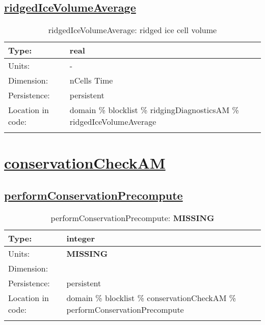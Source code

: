 \subsection[ridgedIceVolumeAverage]{\hyperref[sec:var_tab_ridgingDiagnosticsAM]{ridgedIceVolumeAverage}}
\label{subsec:var_sec_ridgingDiagnosticsAM_ridgedIceVolumeAverage}
\begin{center}
\begin{longtable}{| p{2.0in} | p{4.0in} |}
        \hline 
        Type: & real \\
        \hline 
        Units: & \si{-} \\
        \hline 
        Dimension: & nCells Time \\
        \hline 
        Persistence: & persistent \\
        \hline 
         Location in code: & domain \% blocklist \% ridgingDiagnosticsAM \% ridgedIceVolumeAverage \\
         \hline 
    \caption{ridgedIceVolumeAverage: ridged ice cell volume}
\end{longtable}
\end{center}
\section[conservationCheckAM]{\hyperref[sec:var_tab_conservationCheckAM]{conservationCheckAM}}
\label{sec:var_sec_conservationCheckAM}
\subsection[performConservationPrecompute]{\hyperref[sec:var_tab_conservationCheckAM]{performConservationPrecompute}}
\label{subsec:var_sec_conservationCheckAM_performConservationPrecompute}
\begin{center}
\begin{longtable}{| p{2.0in} | p{4.0in} |}
        \hline 
        Type: & integer \\
        \hline 
        Units: & {\bf \color{red} MISSING} \\
        \hline 
        Dimension: &  \\
        \hline 
        Persistence: & persistent \\
        \hline 
         Location in code: & domain \% blocklist \% conservationCheckAM \% performConservationPrecompute \\
         \hline 
    \caption{performConservationPrecompute: {\bf \color{red} MISSING}}
\end{longtable}
\end{center}
